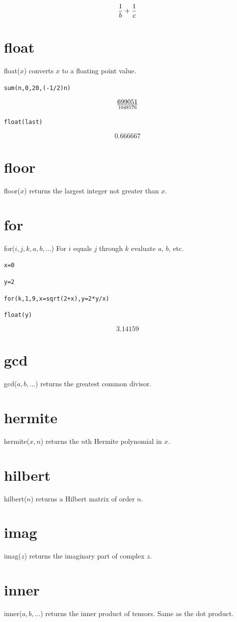 \documentclass[12pt]{book}
\begin{document}
$${1\over b}+{1\over c}$$

\section*{float}
float($x$) converts $x$ to a floating point value.

\medskip
{\tt sum(n,0,20,(-1/2){}n)}

$$699051\over1048576$$

{\tt float(last)}

$$0.666667$$

\section*{floor}
floor($x$) returns the largest integer not greater than $x$.

\section*{for}
for($i,j,k,a,b,\ldots$) For $i$ equals $j$ through $k$ evaluate $a$, $b$, etc.

\medskip
{\tt x=0}

{\tt y=2}

{\tt for(k,1,9,x=sqrt(2+x),y=2*y/x)}

{\tt float(y)}

$$3.14159$$

\section*{gcd}
gcd($a,b,\ldots$) returns the greatest common divisor.

\section*{hermite}
hermite($x,n$) returns the $n$th Hermite polynomial in $x$.

\section*{hilbert}
hilbert($n$) returns a Hilbert matrix of order $n$.

\section*{imag}
imag($z$) returns the imaginary part of complex $z$.

\section*{inner}
inner($a,b,\ldots$) returns the inner product of tensors.
Same as the dot product.
\end{document}
